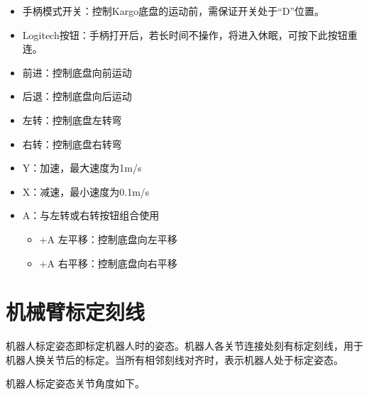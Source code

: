 \documentclass[a4paper,11pt,english,openany,oneside]{sphinxmanual}
\begin{document}
\begin{itemize}
\item {} 
 手柄模式开关：控制Kargo底盘的运动前，需保证开关处于“D”位置。

\item {} 
 Logitech按钮：手柄打开后，若长时间不操作，将进入休眠，可按下此按钮重连。

\item {} 
 前进：控制底盘向前运动

\item {} 
 后退：控制底盘向后运动

\item {} 
 左转：控制底盘左转弯

\item {} 
 右转：控制底盘右转弯

\item {} 
 Y：加速，最大速度为1m/s

\item {} 
 X：减速，最小速度为0.1m/s

\item {} 
 A：与左转或右转按钮组合使用
\begin{itemize}
\item {} 
+A 左平移：控制底盘向左平移

\item {} 
+A 右平移：控制底盘向右平移

\end{itemize}

\end{itemize}


\section{机械臂标定刻线}
\label{\detokenize{07 _u6280_u672f_u89c4_u683c:id43}}\label{\detokenize{07 _u6280_u672f_u89c4_u683c:id44}}
\sphinxAtStartPar
机器人标定姿态即标定机器人时的姿态。机器人各关节连接处刻有标定刻线，用于机器人换关节后的标定。当所有相邻刻线对齐时，表示机器人处于标定姿态。

\sphinxAtStartPar
机器人标定姿态关节角度如下。
\end{document}
